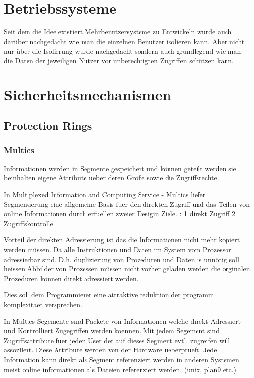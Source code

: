 \documentclass[9pt,technote]{IEEEtran}
\begin{document}
   \section{Betriebssysteme}
     Seit dem die Idee existiert Mehrbenutzersysteme zu Entwickeln wurde auch dar\"uber nachgedacht wie man die einzelnen Benutzer isolieren kann.
     Aber nicht nur \"uber die Isolierung wurde nachgedacht sondern auch grundlegend wie man die Daten 
     der jeweiligen Nutzer vor unberechtigten Zugriffen sch\"utzen kann.
     
  \section{Sicherheitsmechanismen} \label{sec:protection}
    \subsection{Protection Rings}
      \subsubsection{Multics}  
   
		   Informationen werden in Segmente gespeichert und k\"onnen geteilt werden sie beinhalten eigene Attribute 
		   ueber deren Gr\"o\ss e sowie die Zugriffsrechte.
		   
		   In Multiplexed Information and Computing Service - Multics  liefer Segmentierung eine allgemeine Basis fuer den direkten Zugriff
		   und das Teilen von online Informationen durch erfuellen zweier Desigin Ziele. : 1 direkt Zugriff 2 Zugriffskontrolle
		   
		   Vorteil der direkten Adressierung ist das die Informationen nicht mehr kopiert werden m\"ussen. Da alle Instruktionen und Daten
		   im System vom Prozessor adressierbar sind. D.h. duplizierung von Prozeduren und Daten is unn\"otig soll heissen Abbilder von Prozessen m\"ussen
		   nicht vorher geladen werden die orginalen Prozeduren k\"onnen direkt adressiert werden.
		   
		  Dies soll dem Programmierer eine attraktive reduktion der programm komplexitaet versprechen.
		  
		  In Multics Segemente sind Packete von Informationen welche direkt Adressiert und Kontrolliert Zugegriffen werden koennen.
		  Mit jedem Segement sind Zugriffsattribute fuer jeden User der auf dieses Segment evtl. zugreifen will assoziiert.
		  Diese Attribute werden von der Hardware ueberprueft. Jede Information kann direkt als Segment referenziert werden
		  in anderen Systemen meist online informationen als Dateien referenziert werden. (unix, plan9 etc.)
		  
\end{document}
